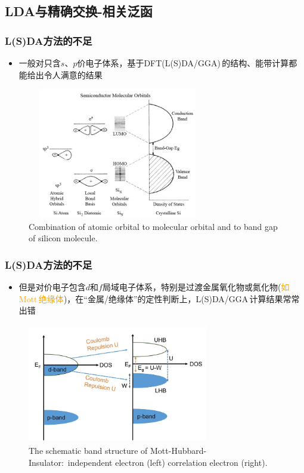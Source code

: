 \subsection{\rm{LDA}与精确交换-相关泛函}
\frame
{
	\frametitle{\textrm{L(S)DA}方法的不足}
	\begin{itemize}
		\item 一般对只含$s$、$p$价电子体系，基于\textrm{DFT(L(S)DA/GGA)\,}的结构、能带计算都能给出令人满意的结果
	\end{itemize}
\begin{figure}[h!]
\centering
\vspace*{-0.25in}
\includegraphics[height=2.25in,width=3.1in,viewport=0 0 630 560,clip]{Figures/Combination-of-atomic-orbital-to-molecular-orbital-and-to-band-gap-of-silicon-molecule.png}
\caption{\tiny \textrm{Combination of atomic orbital to molecular orbital and to band gap of silicon molecule.}}%
\label{LDA_U-1}
\end{figure}
}

\frame
{
	\frametitle{\textrm{L(S)DA}方法的不足}
	\begin{itemize}
		\item 但是对价电子包含$d$和$f$局域电子体系，特别是过渡金属氧化物或氮化物(\textcolor{orange}{如\textrm{Mott}\,绝缘体})，在“金属/绝缘体”的定性判断上，\textrm{L(S)DA/GGA}\,计算结果常常出错
	\end{itemize}
\begin{figure}[h!]
\centering
\vspace*{-0.20in}
\includegraphics[height=2.05in,width=3.1in,viewport=0 0 205 140,clip]{Figures/Band-diagram-of-Mott-Hubbard-Insulator.jpg}
\caption{\tiny \textrm{The schematic band structure of Mott-Hubbard-Insulator:~independent electron (left) correlation electron (right).}}%
\label{LDA_U-3}
\end{figure}
}

